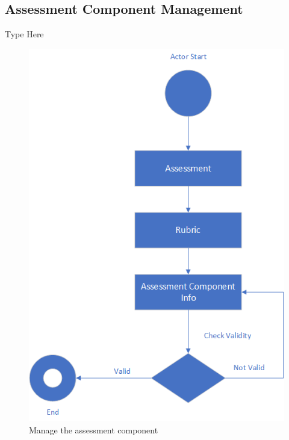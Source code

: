 \documentclass[12pt,a4paper]{article}
\begin{document}
\subsection{Assessment Component Management}
Type Here
\begin{figure}[H]
  \centering
    \includegraphics[scale=1]{Assessment Component}

  \caption{Manage the assessment component}
\end{figure}
\end{document}
